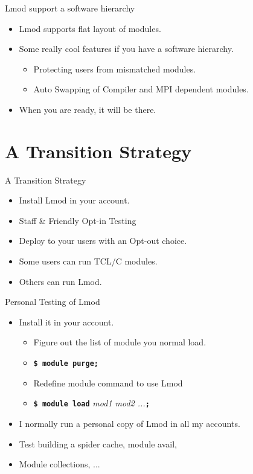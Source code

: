 \documentclass{beamer}
\begin{document}
\begin{frame}{Lmod support a software hierarchy}
  \begin{itemize}
    \item Lmod supports flat layout of modules.
    \item Some really cool features if you have a software hierarchy.
      \begin{itemize}
        \item Protecting users from mismatched modules.
        \item Auto Swapping of Compiler and MPI dependent modules.
      \end{itemize}
    \item When you are ready, it will be there.
  \end{itemize}
\end{frame}

\section{A Transition Strategy}

\begin{frame}{A Transition Strategy}
  \begin{itemize}
    \item Install Lmod in your account.
    \item Staff \& Friendly Opt-in Testing
    \item Deploy to your users with an Opt-out choice.
    \item Some users can run TCL/C modules.
    \item Others can run Lmod.
  \end{itemize}
\end{frame}

\begin{frame}{Personal Testing of Lmod}
  \begin{itemize}
    \item Install it in your account.
      \begin{itemize}
        \item Figure out the list of module you normal load.
        \item \texttt{\bf \$ module purge;}
        \item Redefine module command to use Lmod
        \item \texttt{\bf \$ module load} \emph{mod1 mod2 ...}\texttt{\bf ;}
      \end{itemize}
    \item I normally run a personal copy of Lmod in all my accounts.
    \item Test building a spider cache, module avail,
    \item Module collections, ...
  \end{itemize}
\end{frame}
\end{document}
